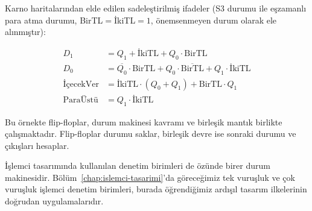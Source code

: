 \begin{ornek}[B.16]
Karno haritalarından elde edilen sadeleştirilmiş ifadeler (S3 durumu ile eşzamanlı para atma durumu, BirTL$=$İkiTL$=1$, önemsenmeyen durum olarak ele alınmıştır):

\[
\begin{aligned}
D_1          &= Q_1 + \text{İkiTL} + Q_0 \cdot \text{BirTL} \\
D_0          &= \overline{Q_0} \cdot \text{BirTL}
                 + Q_0 \cdot \overline{\text{BirTL}}
                 + Q_1 \cdot \text{İkiTL} \\
\text{İçecekVer} &= \text{İkiTL} \cdot (Q_0 + Q_1) + \text{BirTL} \cdot Q_1 \\
\text{ParaÜstü}  &= Q_1 \cdot \text{İkiTL}
\end{aligned}
\]

Bu örnekte flip-floplar, durum makinesi kavramı ve birleşik mantık birlikte çalışmaktadır. Flip-floplar durumu saklar, birleşik devre ise sonraki durumu ve çıkışları hesaplar.

İşlemci tasarımında kullanılan denetim birimleri de özünde birer durum makinesidir. Bölüm~\ref{chap:islemci-tasarimi}'da göreceğimiz tek vuruşluk ve çok vuruşluk işlemci denetim birimleri, burada öğrendiğimiz ardışıl tasarım ilkelerinin doğrudan uygulamalarıdır.

\end{ornek}

